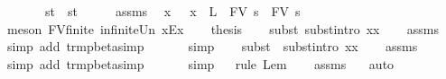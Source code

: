 \begin{isabellebody}
\ \ \ \ \ \ \ {\isachardoublequoteopen}s{\isacharcircum}t\ {\isasymggreater}\ s{\isacharprime}{\isacharcircum}t{\isacharprime}{\isachardoublequoteclose}\isanewline
%
\isadelimproof
%
\endisadelimproof
%
\isatagproof
{}\isamarkupfalse%
\ {\isacharminus}\isanewline
\ \ \isamarkupfalse%
\ assms{\isacharparenleft}{}{\isacharparenright}\ \isamarkupfalse%
\ x\ \ {}{\isacharcolon}\ {\isachardoublequoteopen}x\ {\isasymnotin}\ L\ {\isasymunion}\ FV\ s\ {\isasymunion}\ FV\ s{\isacharprime}{\isachardoublequoteclose}\ \isamarkupfalse%
\ {\isacharparenleft}meson\ FV{\isacharunderscore}finite\ infinite{\isacharunderscore}Un\ x{\isacharunderscore}Ex{\isacharparenright}\isanewline
\ \ \isamarkupfalse%
\ {\isacharquery}thesis\isanewline
\ \ \isamarkupfalse%
\ {\isacharparenleft}subst\ subst{\isacharunderscore}intro{}{\isacharbrackleft}\ x{\isacharequal}x{\isacharbrackright}{\isacharparenright}\isanewline
\ \ \isamarkupfalse%
\ assms{\isacharparenleft}{}{\isacharparenright}\ \isamarkupfalse%
\ {\isacharparenleft}simp\ add{\isacharcolon}\ trm{\isacharunderscore}pbeta{\isacharunderscore}simp{}{\isacharparenright}\isanewline
\ \ \isamarkupfalse%
\ {}\ \isamarkupfalse%
\ simp\isanewline
\ \ \isamarkupfalse%
\ {\isacharparenleft}subst\ {\isacharparenleft}{}{\isacharparenright}\ subst{\isacharunderscore}intro{}{\isacharbrackleft}\ x{\isacharequal}x{\isacharbrackright}{\isacharparenright}\isanewline
\ \ \isamarkupfalse%
\ assms{\isacharparenleft}{}{\isacharparenright}\ \isamarkupfalse%
\ {\isacharparenleft}simp\ add{\isacharcolon}\ trm{\isacharunderscore}pbeta{\isacharunderscore}simp{}{\isacharparenright}\isanewline
\ \ \isamarkupfalse%
\ {}\ \isamarkupfalse%
\ simp\isanewline
\ \ \isamarkupfalse%
{\isacharparenleft}rule\ Lem{}{\isacharunderscore}{}{\isacharunderscore}{}{\isacharparenright}\isanewline
\ \ \isamarkupfalse%
\ assms\ {}\ \isamarkupfalse%
\ auto\isanewline
{}\isamarkupfalse%
%
\endisatagproof
{\isafoldproof}%
%
\isadelimproof
\isanewline
%
\endisadelimproof
\isanewline
{}\isamarkupfalse%

\end{isabellebody}

